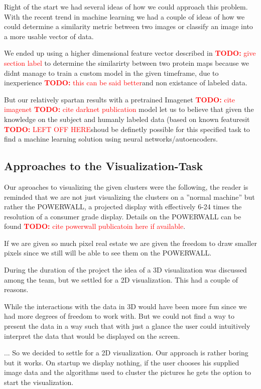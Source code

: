 \documentclass[journal]{vgtc}       %
\newcommand{\todo}[1]{\textcolor{red}{\textbf{TODO:} #1}}
\begin{document}
Right of the start we had several ideas of how we could approach this problem. 
With the recent trend in machine learning we had a couple of ideas of how we could determine a similarity metric between two images or classify an image into a more usable vector of data.

We ended up using a higher dimensional feature vector described in \todo{give section label} to determine the similarirty between two protein maps because we didnt manage to train a custom model in the given timeframe, due to inexperience \todo{this can be said better}and non existance of labeled data.

But our relatively spartan results with a pretrained Imagenet \todo{cite imagenet} \cite{imagenet} \todo{cite darknet publication}  model let us to believe that given the knowledge on the subject and humanly labeled data (based on known featuresit \todo{LEFT OFF HERE}shoud be definetly possible for this specified task to find a machine learning  solution using neural networks/autoencoders.

\subsection{Approaches to the Visualization-Task}

Our aproaches to visualizing the given clusters were the following, the reader is reminded that we are not just visualizing the clusters on a ''normal machine'' but rather the POWERWALL, a projected display with effectively 6-24 times the resolution of a consumer grade display. Details on the POWERWALL can be found \todo{cite powerwall publicatoin here if available}. \cite{powerwall}

If we are given so much pixel real estate we are given the freedom to draw smaller pixels since we still will be able to see them on the POWERWALL.

During the duration of the project the idea of a 3D visualization was discussed among the team, but we settled for a 2D visualization. This had a couple of reasons.

While the interactions with the data in 3D would have been more fun since we had more degrees of freedom to work with.
But we could not find a way to present the data in a way such that with just a glance the user could intuitively interpret the data that would be displayed on the screen.

... So we decided to settle for a 2D visualization. Our approach is rather boring but it works. On startup we display nothing, if the user chooses his supplied image data and the algorithms used to cluster the pictures he gets the option to start the visualization.
\end{document}
